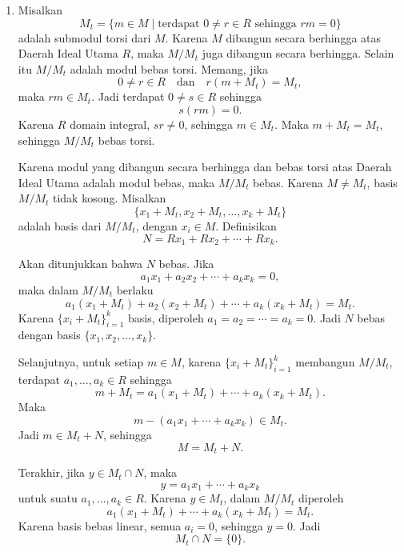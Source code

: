 \documentclass[11pt,letterpaper]{article}
\begin{document}
\begin{enumerate}
        Dengan demikian $S$ membangun $M$ dan bebas linear, sehingga $S$ adalah basis dari $M$. Jadi
        \[
          \boxed{M \text{ adalah modul bebas}.}
        \]

  \item Misalkan
        \[
          M_t=\{m \in M \mid \text{terdapat }0 \neq r \in R \text{ sehingga } rm=0\}
        \]
        adalah submodul torsi dari $M$. Karena $M$ dibangun secara berhingga atas Daerah Ideal Utama $R$, maka $M/M_t$ juga dibangun secara berhingga. Selain itu $M/M_t$ adalah modul bebas torsi. Memang, jika
        \[
          0 \neq r \in R
          \quad \text{dan} \quad
          r(m+M_t)=M_t,
        \]
        maka $rm \in M_t$. Jadi terdapat $0 \neq s \in R$ sehingga
        \[
          s(rm)=0.
        \]
        Karena $R$ domain integral, $sr \neq 0$, sehingga $m \in M_t$. Maka $m+M_t=M_t$, sehingga $M/M_t$ bebas torsi.

        Karena modul yang dibangun secara berhingga dan bebas torsi atas Daerah Ideal Utama adalah modul bebas, maka $M/M_t$ bebas. Karena $M \neq M_t$, basis $M/M_t$ tidak kosong. Misalkan
        \[
          \{x_1+M_t,x_2+M_t,\ldots,x_k+M_t\}
        \]
        adalah basis dari $M/M_t$, dengan $x_i \in M$. Definisikan
        \[
          N=Rx_1+Rx_2+\cdots+Rx_k.
        \]

        Akan ditunjukkan bahwa $N$ bebas. Jika
        \[
          a_1x_1+a_2x_2+\cdots+a_kx_k=0,
        \]
        maka dalam $M/M_t$ berlaku
        \[
          a_1(x_1+M_t)+a_2(x_2+M_t)+\cdots+a_k(x_k+M_t)=M_t.
        \]
        Karena $\{x_i+M_t\}_{i=1}^{k}$ basis, diperoleh $a_1=a_2=\cdots=a_k=0$. Jadi $N$ bebas dengan basis $\{x_1,x_2,\ldots,x_k\}$.

        Selanjutnya, untuk setiap $m \in M$, karena $\{x_i+M_t\}_{i=1}^{k}$ membangun $M/M_t$, terdapat $a_1,\ldots,a_k \in R$ sehingga
        \[
          m+M_t=a_1(x_1+M_t)+\cdots+a_k(x_k+M_t).
        \]
        Maka
        \[
          m-(a_1x_1+\cdots+a_kx_k) \in M_t.
        \]
        Jadi $m \in M_t+N$, sehingga
        \[
          M=M_t+N.
        \]

        Terakhir, jika $y \in M_t \cap N$, maka
        \[
          y=a_1x_1+\cdots+a_kx_k
        \]
        untuk suatu $a_1,\ldots,a_k \in R$. Karena $y \in M_t$, dalam $M/M_t$ diperoleh
        \[
          a_1(x_1+M_t)+\cdots+a_k(x_k+M_t)=M_t.
        \]
        Karena basis bebas linear, semua $a_i=0$, sehingga $y=0$. Jadi
        \[
          M_t \cap N=\{0\}.
        \]


\end{enumerate}
\end{document}
